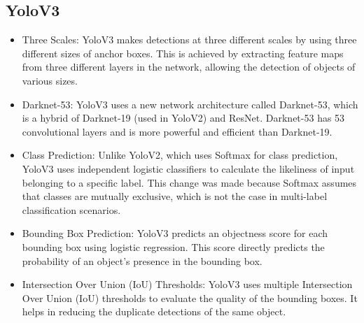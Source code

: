 \subsection{YoloV3}
\begin{itemize}
  \item Three Scales: YoloV3 makes detections at three different scales by using three different sizes of anchor boxes. This is achieved by extracting feature maps from three different layers in the network, allowing the detection of objects of various sizes.
  \item Darknet-53: YoloV3 uses a new network architecture called Darknet-53, which is a hybrid of Darknet-19 (used in YoloV2) and ResNet. Darknet-53 has 53 convolutional layers and is more powerful and efficient than Darknet-19.
  \item Class Prediction: Unlike YoloV2, which uses Softmax for class prediction, YoloV3 uses independent logistic classifiers to calculate the likeliness of input belonging to a specific label. This change was made because Softmax assumes that classes are mutually exclusive, which is not the case in multi-label classification scenarios.
  \item Bounding Box Prediction: YoloV3 predicts an objectness score for each bounding box using logistic regression. This score directly predicts the probability of an object's presence in the bounding box.
  \item Intersection Over Union (IoU) Thresholds: YoloV3 uses multiple Intersection Over Union (IoU) thresholds to evaluate the quality of the bounding boxes. It helps in reducing the duplicate detections of the same object.
\end{itemize}

